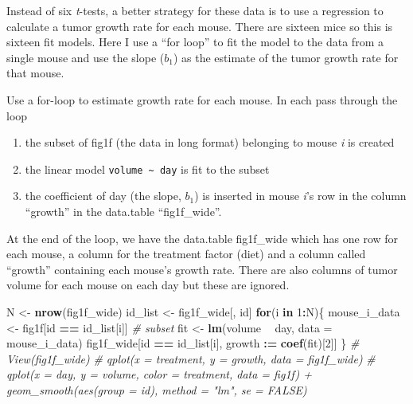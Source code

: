 \documentclass[]{book}
\newenvironment{Shaded}{\begin{snugshade}}{\end{snugshade}}
\newcommand{\CommentTok}[1]{\textcolor[rgb]{0.56,0.35,0.01}{\textit{#1}}}
\newcommand{\ControlFlowTok}[1]{\textcolor[rgb]{0.13,0.29,0.53}{\textbf{#1}}}
\newcommand{\DataTypeTok}[1]{\textcolor[rgb]{0.13,0.29,0.53}{#1}}
\newcommand{\DecValTok}[1]{\textcolor[rgb]{0.00,0.00,0.81}{#1}}
\newcommand{\ErrorTok}[1]{\textcolor[rgb]{0.64,0.00,0.00}{\textbf{#1}}}
\newcommand{\KeywordTok}[1]{\textcolor[rgb]{0.13,0.29,0.53}{\textbf{#1}}}
\newcommand{\NormalTok}[1]{#1}
\newcommand{\OperatorTok}[1]{\textcolor[rgb]{0.81,0.36,0.00}{\textbf{#1}}}
\newcommand{\StringTok}[1]{\textcolor[rgb]{0.31,0.60,0.02}{#1}}
\providecommand{\tightlist}{%
  \setlength{\itemsep}{0pt}\setlength{\parskip}{0pt}}
\begin{document}
Instead of six \emph{t}-tests, a better strategy for these data is to use a regression to calculate a tumor growth rate for each mouse. There are sixteen mice so this is sixteen fit models. Here I use a ``for loop'' to fit the model to the data from a single mouse and use the slope (\(b_1\)) as the estimate of the tumor growth rate for that mouse.

Use a for-loop to estimate growth rate for each mouse. In each pass through the loop

\begin{enumerate}
\def\labelenumi{\arabic{enumi}.}
\tightlist
\item
  the subset of fig1f (the data in long format) belonging to mouse \emph{i} is created
\item
  the linear model \texttt{volume\ \textasciitilde{}\ day} is fit to the subset
\item
  the coefficient of day (the slope, \(b_1\)) is inserted in mouse \emph{i}'s row in the column ``growth'' in the data.table ``fig1f\_wide''.
\end{enumerate}

At the end of the loop, we have the data.table fig1f\_wide which has one row for each mouse, a column for the treatment factor (diet) and a column called ``growth'' containing each mouse's growth rate. There are also columns of tumor volume for each mouse on each day but these are ignored.

\begin{Shaded}
\begin{Highlighting}[]
\NormalTok{N <-}\StringTok{ }\KeywordTok{nrow}\NormalTok{(fig1f_wide)}
\NormalTok{id_list <-}\StringTok{ }\NormalTok{fig1f_wide[, id]}
\ControlFlowTok{for}\NormalTok{(i }\ControlFlowTok{in} \DecValTok{1}\OperatorTok{:}\NormalTok{N)\{}
\NormalTok{  mouse_i_data <-}\StringTok{ }\NormalTok{fig1f[id }\OperatorTok{==}\StringTok{ }\NormalTok{id_list[i]] }\CommentTok{# subset}
\NormalTok{  fit <-}\StringTok{ }\KeywordTok{lm}\NormalTok{(volume }\OperatorTok{~}\StringTok{ }\NormalTok{day, }\DataTypeTok{data =}\NormalTok{ mouse_i_data)}
\NormalTok{  fig1f_wide[id }\OperatorTok{==}\StringTok{ }\NormalTok{id_list[i], growth }\OperatorTok{:}\ErrorTok{=}\StringTok{ }\KeywordTok{coef}\NormalTok{(fit)[}\DecValTok{2}\NormalTok{]]}
\NormalTok{\}}
\CommentTok{# View(fig1f_wide)}
\CommentTok{# qplot(x = treatment, y = growth, data = fig1f_wide)}
\CommentTok{# qplot(x = day, y = volume, color = treatment, data = fig1f) + geom_smooth(aes(group = id), method = "lm", se = FALSE)}
\end{Highlighting}
\end{Shaded}
\end{document}
